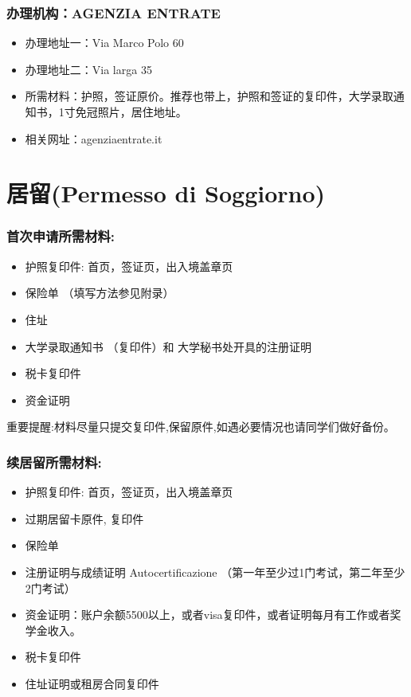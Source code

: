 \documentclass[3pt,a5paper,openright,twoside]{book}
\begin{document}
\subsubsection{办理机构：AGENZIA ENTRATE}

\begin{itemize}
\item 办理地址一：Via Marco Polo 60
\item 办理地址二：Via larga 35
\item 所需材料：护照，签证原价。推荐也带上，护照和签证的复印件，大学录取通知书，1寸免冠照片，居住地址。
\item 相关网址：agenziaentrate.it
\end{itemize}


\section{居留(Permesso di Soggiorno)}
\subsubsection{首次申请所需材料:}
\begin{itemize} 
\item 护照复印件: 首页，签证页，出入境盖章页
\item 保险单 （填写方法参见附录）
\item 住址
\item 大学录取通知书 （复印件）和 大学秘书处开具的注册证明
\item 税卡复印件
\item 资金证明
\end{itemize}
重要提醒:材料尽量只提交复印件,保留原件,如遇必要情况也请同学们做好备份。

\subsubsection{续居留所需材料:}
\begin{itemize} 
\item 护照复印件: 首页，签证页，出入境盖章页
\item 过期居留卡原件, 复印件
\item 保险单
\item 注册证明与成绩证明 Autocertificazione （第一年至少过1门考试，第二年至少2门考试）
\item 资金证明：账户余额5500以上，或者visa复印件，或者证明每月有工作或者奖学金收入。
\item 税卡复印件
\item 住址证明或租房合同复印件
\end{itemize}
\end{document}
